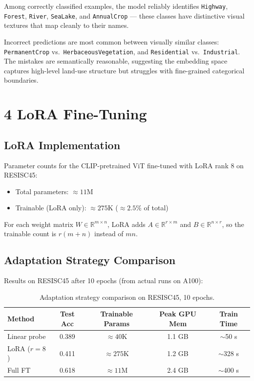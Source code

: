 \documentclass[11pt]{article}
\begin{document}
Among correctly classified examples, the model reliably identifies
\texttt{Highway}, \texttt{Forest}, \texttt{River}, \texttt{SeaLake}, and
\texttt{AnnualCrop} --- these classes have distinctive visual textures that
map cleanly to their names.

Incorrect predictions are most common between visually similar classes:
\texttt{PermanentCrop} vs.\ \texttt{HerbaceousVegetation}, and
\texttt{Residential} vs.\ \texttt{Industrial}. The mistakes are semantically
reasonable, suggesting the embedding space captures high-level land-use
structure but struggles with fine-grained categorical boundaries.

\section*{4 LoRA Fine-Tuning}

\subsection*{LoRA Implementation}

Parameter counts for the CLIP-pretrained ViT fine-tuned with LoRA rank 8
on RESISC45:

\begin{itemize}[noitemsep]
  \item Total parameters: $\approx 11$M
  \item Trainable (LoRA only): $\approx 275$K ($\approx 2.5\%$ of total)
\end{itemize}

For each weight matrix $W \in \mathbb{R}^{m \times n}$, LoRA adds
$A \in \mathbb{R}^{r \times m}$ and $B \in \mathbb{R}^{n \times r}$, so
the trainable count is $r(m+n)$ instead of $mn$.

\subsection*{Adaptation Strategy Comparison}

Results on RESISC45 after 10 epochs (from actual runs on A100):

\begin{table}[H]
\centering
\begin{tabular}{lcccc}
\toprule
Method        & Test Acc & Trainable Params & Peak GPU Mem & Train Time \\
\midrule
Linear probe  & 0.389   & $\approx 40$K    & 1.1 GB       & $\sim$50 s \\
LoRA ($r=8$)  & 0.411   & $\approx 275$K   & 1.2 GB       & $\sim$328 s \\
Full FT       & 0.618   & $\approx 11$M    & 2.4 GB       & $\sim$400 s \\
\bottomrule
\end{tabular}
\caption{Adaptation strategy comparison on RESISC45, 10 epochs.}
\end{table}
\end{document}
